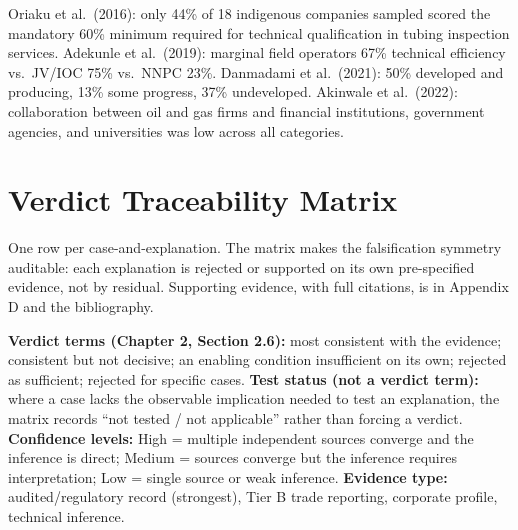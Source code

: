 \documentclass[twoside,fontset=lmodern]{mitthesis}
\begin{document}
Oriaku et al.~(2016): only 44\% of 18 indigenous companies sampled
scored the mandatory 60\% minimum required for technical qualification
in tubing inspection services. Adekunle et al.~(2019): marginal field
operators 67\% technical efficiency vs.~JV/IOC 75\% vs.~NNPC 23\%.
Danmadami et al.~(2021): 50\% developed and producing, 13\% some
progress, 37\% undeveloped. Akinwale et al.~(2022): collaboration
between oil and gas firms and financial institutions, government
agencies, and universities was low across all categories.


\hypertarget{verdict-traceability-matrix}{%
\chapter{Verdict Traceability
Matrix}\label{verdict-traceability-matrix}}

One row per case-and-explanation. The matrix makes the falsification
symmetry auditable: each explanation is rejected or supported on its own
pre-specified evidence, not by residual. Supporting evidence, with full
citations, is in Appendix D and the bibliography.

\textbf{Verdict terms (Chapter 2, Section 2.6):} most consistent with
the evidence; consistent but not decisive; an enabling condition
insufficient on its own; rejected as sufficient; rejected for specific
cases. \textbf{Test status (not a verdict term):} where a case lacks the
observable implication needed to test an explanation, the matrix records
``not tested / not applicable'' rather than forcing a verdict.
\textbf{Confidence levels:} High = multiple independent sources converge
and the inference is direct; Medium = sources converge but the inference
requires interpretation; Low = single source or weak inference.
\textbf{Evidence type:} audited/regulatory record (strongest), Tier B
trade reporting, corporate profile, technical inference.
\end{document}
